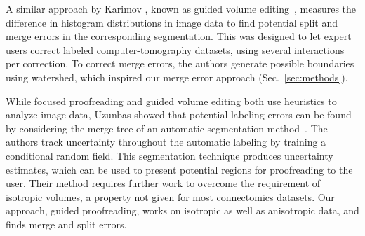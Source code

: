 A similar approach by Karimov \etal, known as guided volume editing~\cite{karimov_guided_volume_editing}, measures the difference in histogram distributions in image data to find potential split and merge errors in the corresponding segmentation. This was designed to let expert users correct labeled computer-tomography datasets, using several interactions per correction. To correct merge errors, the authors generate possible boundaries using watershed, which inspired our merge error approach (Sec.~\ref{sec:methods}). 

While focused proofreading and guided volume editing both use heuristics to analyze image data, Uzunbas \etal showed that potential labeling errors can be found by considering the merge tree of an automatic segmentation method~\cite{uzunbas}. The authors track uncertainty throughout the automatic labeling by training a conditional random field. This segmentation technique produces uncertainty estimates, which can be used to present potential regions for proofreading to the user. Their method requires further work to overcome the requirement of isotropic volumes, a property not given for most connectomics datasets. Our approach, guided proofreading, works on isotropic as well as anisotropic data, and finds merge and split errors.